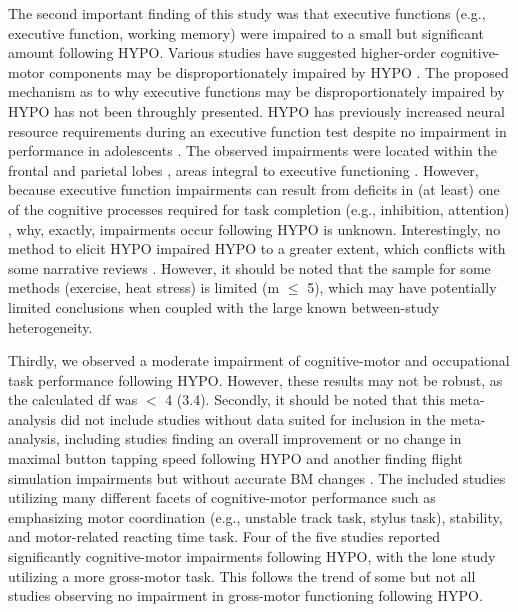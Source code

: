 The second important finding of this study was that executive functions (e.g., executive function, working memory) were impaired to a small but significant amount following HYPO. Various studies have suggested higher-order cognitive-motor components may be disproportionately impaired by HYPO \cite{tomporowski_effects_2007, lieberman_hydration_2007,grandjean_dehydration_2007,nuccio_fluid_2017}. The proposed mechanism as to why executive functions may be disproportionately impaired by HYPO has not been throughly presented. HYPO has previously increased neural resource requirements during an executive function test despite no impairment in performance in adolescents \cite{kempton_dehydration_2011}. The observed impairments were located within the frontal and parietal lobes \cite{kempton_dehydration_2011}, areas integral to executive functioning \cite{logue_neural_2014}. However, because executive function impairments can result from deficits in (at least) one of the cognitive processes required for task completion (e.g., inhibition, attention) \cite{logue_neural_2014}, why, exactly, impairments occur following HYPO is unknown. Interestingly, no method to elicit HYPO impaired HYPO to a greater extent, which conflicts with some narrative reviews \cite{nuccio_fluid_2017}. However, it should be noted that the sample for some methods (exercise, heat stress) is limited (m ${\leq}$ 5), which may have potentially limited conclusions when coupled with the large known between-study heterogeneity.     

Thirdly, we observed a moderate impairment of cognitive-motor and occupational task performance following HYPO. However, these results may not be robust, as the calculated df was ${<}$ 4 (3.4). Secondly, it should be noted that this meta-analysis did not include studies without data suited for inclusion in the meta-analysis, including studies finding an overall improvement \cite{bandelow_effects_2010} or no change \cite{hogervorst_cognitive_1996} in maximal button tapping speed following HYPO and another finding flight simulation impairments but without accurate BM changes \cite{lindseth_effects_2013}. The included studies utilizing many different facets of cognitive-motor performance such as emphasizing motor coordination (e.g., unstable track task, stylus task), stability, and motor-related reacting time task. Four of the five studies reported significantly cognitive-motor impairments following HYPO, with the lone study utilizing a more gross-motor task. This follows the trend of some \cite{savoie_effect_2015} but not all \cite{baker_progressive_2007} studies observing no impairment in gross-motor functioning following HYPO. 

